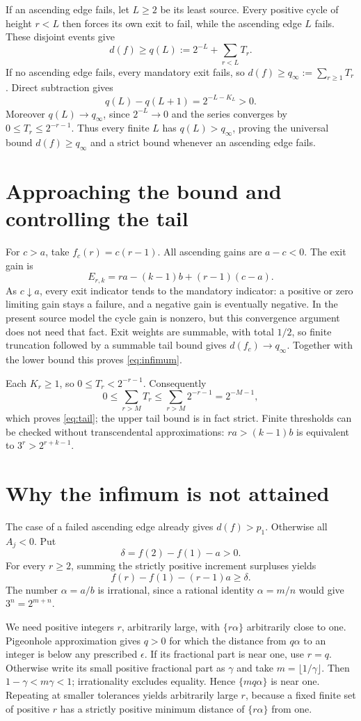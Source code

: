 \documentclass[11pt,letterpaper]{article}
\begin{document}
If an ascending edge fails, let $L\ge2$ be its least source. Every positive
cycle of height $r<L$ then forces its own exit to fail, while the ascending
edge $L$ fails. These disjoint events give
\[
 d(f)\ge q(L):=2^{-L}+\sum_{r<L}T_r.
\]
If no ascending edge fails, every mandatory exit fails, so
$d(f)\ge q_\infty:=\sum_{r\ge1}T_r$.
Direct subtraction gives
\[
 q(L)-q(L+1)=2^{-L-K_L}>0.
\]
Moreover $q(L)\to q_\infty$, since $2^{-L}\to0$ and the series converges
by $0\le T_r\le2^{-r-1}$. Thus every finite $L$ has
$q(L)>q_\infty$, proving the universal bound $d(f)\ge q_\infty$ and a strict
bound whenever an ascending edge fails.

\section{Approaching the bound and controlling the tail}
For $c>a$, take $f_c(r)=c(r-1)$. All ascending gains are $a-c<0$. The exit gain is
\[
 E_{r,k}=ra-(k-1)b+(r-1)(c-a).
\]
As $c\downarrow a$, every exit indicator tends to the mandatory indicator:
a positive or zero limiting gain stays a failure, and a negative gain is
eventually negative. In the present source model the cycle gain is nonzero,
but this convergence argument does not need that fact. Exit weights are
summable, with total $1/2$, so finite truncation followed by a summable tail
bound gives $d(f_c)\to q_\infty$. Together with the lower bound this proves
\eqref{eq:infimum}.

Each $K_r\ge1$, so $0\le T_r<2^{-r-1}$. Consequently
\[
 0\le\sum_{r>M}T_r\le\sum_{r>M}2^{-r-1}=2^{-M-1},
\]
which proves \eqref{eq:tail}; the upper tail bound is in fact strict.
Finite thresholds can be checked without transcendental approximations:
$ra>(k-1)b$ is equivalent to $3^r>2^{r+k-1}$.

\section{Why the infimum is not attained}
The case of a failed ascending edge already gives $d(f)>p_1$. Otherwise all
$A_j<0$. Put
\[
 \delta=f(2)-f(1)-a>0.
\]
For every $r\ge2$, summing the strictly positive increment surpluses yields
\begin{equation}\label{eq:surplus}
 f(r)-f(1)-(r-1)a\ge\delta.
\end{equation}
The number $\alpha=a/b$ is irrational, since a rational identity
$\alpha=m/n$ would give $3^n=2^{m+n}$.

We need positive integers $r$, arbitrarily large, with $\{r\alpha\}$
arbitrarily close to one. Pigeonhole approximation gives $q>0$ for which
the distance from $q\alpha$ to an integer is below any prescribed
$\epsilon$. If its fractional part is near one, use $r=q$. Otherwise write
its small positive fractional part as $\gamma$ and take
$m=\lfloor1/\gamma\rfloor$. Then $1-\gamma<m\gamma<1$; irrationality
excludes equality. Hence $\{mq\alpha\}$ is near one. Repeating at smaller
tolerances yields arbitrarily large $r$, because a fixed finite set of
positive $r$ has a strictly positive minimum distance of $\{r\alpha\}$
from one.
\end{document}
